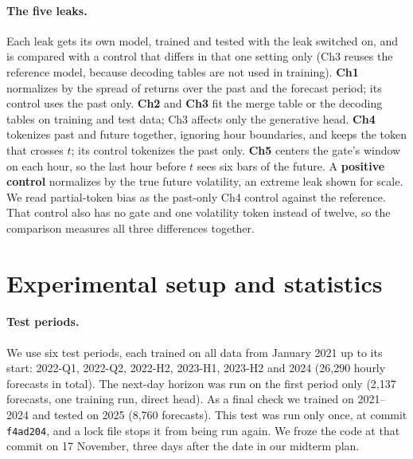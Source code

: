 \documentclass{article}
\begin{document}
\paragraph{The five leaks.}
Each leak gets its own model, trained and tested with the leak switched on, and is compared with a
control that differs in that one setting only (Ch3 reuses the reference model, because decoding tables
are not used in training). \textbf{Ch1} normalizes by the spread of returns over the past and the
forecast period; its control uses the past only. \textbf{Ch2} and \textbf{Ch3} fit the merge table or
the decoding tables on training and test data; Ch3 affects only the generative head. \textbf{Ch4}
tokenizes past and future together, ignoring hour boundaries, and keeps the token that crosses $t$;
its control tokenizes the past only. \textbf{Ch5} centers the gate's window on each hour, so the last
hour before $t$ sees six bars of the future. A \textbf{positive control} normalizes by the true future
volatility, an extreme leak shown for scale. We read partial-token bias as the past-only Ch4 control
against the reference. That control also has no gate and one volatility token instead of twelve, so
the comparison measures all three differences together.

\section{Experimental setup and statistics}

\paragraph{Test periods.}
We use six test periods, each trained on all data from January 2021 up to its start: 2022-Q1,
2022-Q2, 2022-H2, 2023-H1, 2023-H2 and 2024 (26,290 hourly forecasts in total). The next-day horizon
was run on the first period only (2,137 forecasts, one training run, direct head). As a final check
we trained on 2021--2024 and tested on 2025 (8,760 forecasts). This test was run only once, at commit
\texttt{f4ad204}, and a lock file stops it from being run again. We froze the code at that commit on
17 November, three days after the date in our midterm plan.
\end{document}
